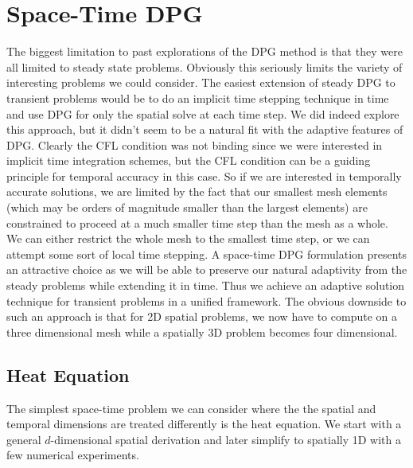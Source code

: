 \documentclass[preprint,12pt]{elsarticle}
\begin{document}
\section{Space-Time DPG}
The biggest limitation to past explorations of the DPG method is that they were all limited to steady state problems.
Obviously this seriously limits the variety of interesting problems we could consider. 
The easiest extension of steady DPG to transient problems would be to do an implicit time stepping technique in time 
and use DPG for only the spatial solve at each time step.
We did indeed explore this approach, but it didn't seem to be a natural fit with the adaptive features of DPG.
Clearly the CFL condition was not binding since we were interested in implicit time integration schemes, 
but the CFL condition can be a guiding principle for temporal accuracy in this case.
So if we are interested in temporally accurate solutions, we are limited by the fact that our smallest mesh elements 
(which may be orders of magnitude smaller than the largest elements) are constrained to proceed at a much smaller time step than the mesh as a whole. 
We can either restrict the whole mesh to the smallest time step, or we can attempt some sort of local time stepping.
A space-time DPG formulation presents an attractive choice as we will be able to preserve our natural adaptivity 
from the steady problems while extending it in time.
Thus we achieve an adaptive solution technique for transient problems in a unified framework.
The obvious downside to such an approach is that for 2D spatial problems, 
we now have to compute on a three dimensional mesh while a spatially 3D problem becomes four dimensional.


%                                          
%                                          
%  
\subsection{Heat Equation}
The simplest space-time problem we can consider where the the spatial and temporal dimensions are treated differently is the heat equation.
We start with a general $d$-dimensional spatial derivation and later simplify to spatially 1D with a few numerical experiments.
\end{document}
